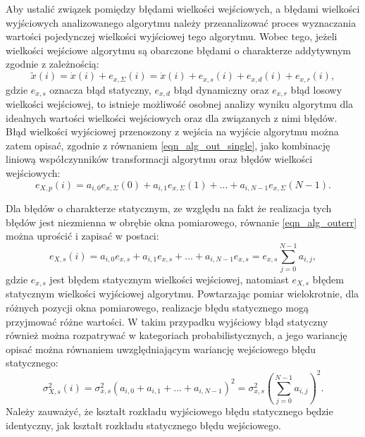 Aby ustalić związek pomiędzy błędami wielkości wejściowych, a błędami wielkości wyjściowych analizowanego algorytmu należy przeanalizować proces wyznaczania wartości pojedynczej wielkości wyjściowej tego algorytmu. Wobec tego, jeżeli wielkości wejściowe algorytmu są obarczone błędami o charakterze addytywnym zgodnie z zależnością:
\begin{equation}
\tilde{x}(i) = \dot{x}(i) + e_{x,\Sigma}(i) = \dot{x}(i) + e_{x,s}(i) + e_{x,d}(i) + e_{x,r}(i) \label{eqn_alg_inputval},
\end{equation}
gdzie $e_{x,s}$ oznacza błąd statyczny, $e_{x,d}$ błąd dynamiczny oraz $e_{x,r}$ błąd losowy wielkości wejściowej, to istnieje możliwość osobnej analizy wyniku algorytmu dla idealnych wartości wielkości wejściowych oraz dla związanych z nimi błędów. Błąd wielkości wyjściowej przenoszony z wejścia na wyjście algorytmu można zatem opisać, zgodnie z równaniem \eqref{eqn_alg_out_single}, jako kombinację liniową współczynników transformacji algorytmu oraz błędów wielkości wejściowych:
\begin{equation}
e_{X,p}(i) = a_{i, 0} e_{x,\Sigma}(0) + a_{i, 1} e_{x,\Sigma}(1) + \hdots + a_{i, N-1} e_{x,\Sigma}(N-1) \label{eqn_alg_outerr}.
\end{equation}

Dla błędów o charakterze statycznym, ze względu na fakt że realizacja tych błędów jest niezmienna w obrębie okna pomiarowego, równanie \eqref{eqn_alg_outerr} można uprościć i zapisać w postaci:
\begin{equation}
e_{X,s}(i) = a_{i, 0} e_{x,s} + a_{i, 1} e_{x,s} + \hdots + a_{i, N-1} e_{x,s} = e_{x,s} \sum _{j = 0} ^{N-1} a_{i, j} \label{eqn_alg_outerr_stat},
\end{equation}
gdzie $e_{x,s}$ jest błędem statycznym wielkości wejściowej, natomiast $e_{X,s}$ błędem statycznym wielkości wyjściowej algorytmu. Powtarzając pomiar wielokrotnie, dla różnych pozycji okna pomiarowego, realizacje błędu statycznego mogą przyjmować różne wartości. W takim przypadku wyjściowy błąd statyczny również można rozpatrywać w kategoriach probabilistycznych, a jego wariancję opisać można równaniem uwzględniającym wariancję wejściowego błędu statycznego:
\begin{equation}
\sigma_{X,s}^{2}(i) = \sigma_{x,s}^{2} \left( a_{i, 0} + a_{i, 1} + \hdots + a_{i, N-1} \right)^{2} = \sigma_{x,s}^{2} \left( \sum _{j = 0} ^{N-1} a_{i, j} \right)^{2} \label{eqn_alg_outvar_stat}.
\end{equation}
Należy zauważyć, że kształt rozkładu wyjściowego błędu statycznego będzie identyczny, jak kształt rozkładu statycznego błędu wejściowego.

